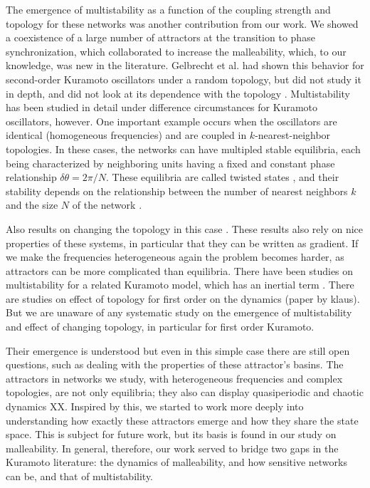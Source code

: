 The emergence of multistability as a function of the coupling strength and topology for these networks was another contribution from our work. We showed a coexistence of a large number of attractors at the transition to phase synchronization, which collaborated to increase the malleability, which, to our knowledge, was new in the literature. Gelbrecht et al. had shown this behavior for second-order Kuramoto oscillators under a random topology, but did not study it in depth, and did not look at its dependence with the topology \cite{}. Multistability has been studied in detail under difference circumstances for Kuramoto oscillators, however. One important example occurs when the oscillators are identical (homogeneous frequencies) and are coupled in $k$-nearest-neighbor topologies. In these cases, the networks can have multipled stable equilibria, each being characterized by neighboring units having a fixed and constant phase relationship $\delta \theta = 2\pi/N$. These equilibria are called twisted states \cite{}, and their stability depends on the relationship between the number of nearest neighbors $k$ and the size $N$ of the network \cite{wiley}.

Also results on changing the topology in this case \cite{sparseonesthatdo}. These results also rely on nice properties of these systems, in particular that they can be written as gradient. If we make the frequencies heterogeneous again the problem becomes harder, as attractors can be more complicated than equilibria. There have been studies on multistability for a related Kuramoto model, which has an inertial term \cite{gelbrecht2020monte, multistabilitythorughlossycouplinghellman}. There are studies on effect of topology for first order on the dynamics (paper by klaus). But we are unaware of any systematic study on the emergence of multistability and effect of changing topology, in particular for first order Kuramoto.

Their emergence is understood but even in this simple case there are still open questions, such as dealing with the properties of these attractor's basins. The attractors in networks we study, with heterogeneous frequencies and complex topologies, are not only equilibria; they also can display quasiperiodic and chaotic dynamics XX. Inspired by this, we started to work more deeply into understanding how exactly these attractors emerge and how they share the state space. This is subject for future work, but its basis is found in our study on malleability. In general, therefore, our work served to bridge two gaps in the Kuramoto literature: the dynamics of malleability, and how sensitive networks can be, and that of multistability. 


